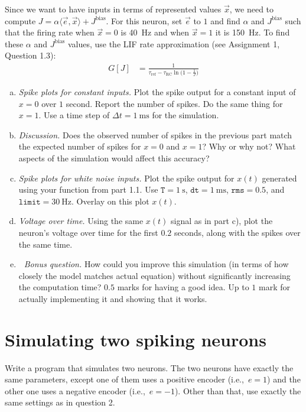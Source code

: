 	Since we want to have inputs in terms of represented values $\vec x$, we need to compute $J = \alpha \langle \vec e, \vec x \rangle + J^\mathrm{bias}$. For this neuron, set $\vec e$ to $1$ and find $\alpha$ and $J^\mathrm{bias}$ such that the firing rate when $\vec x=0$ is \SI{40}{\hertz} and when $\vec x=1$ it is \SI{150}{\hertz}. To find these $\alpha$ and $J^\mathrm{bias}$ values, use the LIF rate approximation (see Assignment 1, Question 1.3):
	\begin{align*}
		G[J] &= \frac{1}{\tau_\mathrm{ref} - \tau_\mathrm{RC} \ln \big( 1 - \frac{1}J \big)}
	\end{align*}

	\begin{enumerate}[a)]
		\item {} \textit{Spike plots for constant inputs.} Plot the spike output for a constant input of $x=0$ over $1$ second. Report the number of spikes. Do the same thing for $x=1$. Use a time step of $\Delta t = \SI{1}{\milli\second}$ for the simulation.
		\item {} \textit{Discussion.} Does the observed number of spikes in the previous part match the expected number of spikes for $x=0$ and $x=1$? Why or why not? What aspects of the simulation would affect this accuracy?
		\item {} \textit{Spike plots for white noise inputs.} Plot the spike output for $x(t)$ generated using your function from part 1.1. Use $\mathtt{T}=\SI{1}{\second}$, $\mathtt{dt}=\SI{1}{\milli\second}$, $\mathtt{rms}=0.5$, and $\mathtt{limit}=\SI{30}{\hertz}$. Overlay on this plot $x(t)$.
		\item {} \textit{Voltage over time.} Using the same $x(t)$ signal as in part c), plot the neuron's voltage over time for the first $0.2$ seconds, along with the spikes over the same time.
		\item {} \textit{{\symbolfont 🌟} Bonus question.} How could you improve this simulation (in terms of how closely the model matches actual equation) without significantly increasing the computation time? $0.5$ marks for having a good idea. Up to $1$ mark for actually implementing it and showing that it works.
	\end{enumerate}

	\section{Simulating two spiking neurons}

	Write a program that simulates two neurons. The two neurons have exactly the same parameters, except one of them uses a positive encoder (i.e.,~$e = 1$) and the other one uses a negative encoder (i.e.,~$e = -1$). Other than that, use exactly the same settings as in question 2.

